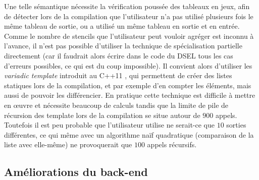 Une telle sémantique nécessite la vérification poussée des tableaux en jeux, afin de détecter lors de la compilation que l'utilisateur n'a pas utilisé plusieurs fois le même tableau de sortie, ou a utilisé un même tableau en sortie et en entrée. Comme le nombre de stencils que l'utilisateur peut vouloir agréger est inconnu à l'avance, il n'est pas possible d'utiliser la technique de spécialisation partielle directement (car il faudrait alors écrire dans le code du DSEL tous les cas d'erreurs possibles, ce qui est du coup impossible). Il convient alors d'utiliser les \emph{variadic template} introduit au \textsf{C++11} \cite{Art6}, qui permettent de créer des listes statiques lors de la compilation, et par exemple d'en compter les éléments, mais aussi de pouvoir les différencier. En pratique cette technique est difficile à mettre en œuvre et nécessite beaucoup de calculs tandis que la limite de pile de récursion des template lors de la compilation se situe autour de $900$ appels. Toutefois il est peu probable que l'utilisateur utilise ne serait-ce que $10$ sorties différentes, ce qui même avec un algorithme naïf quadratique (comparaison de la liste avec elle-même) ne provoquerait que $100$ appels récursifs.


\subsection{Améliorations du back-end}
\label{sec:amelior_backend}

